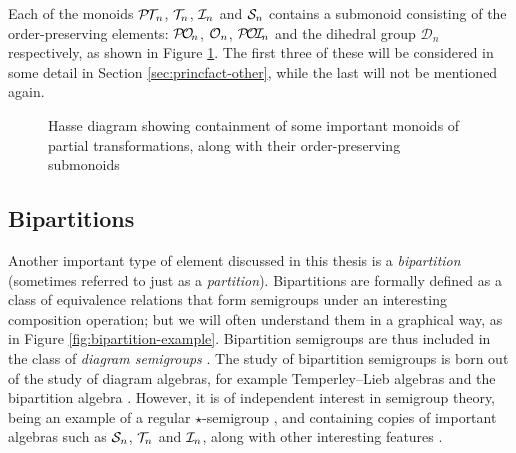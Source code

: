 Each of the monoids $\mathcal{P\!T\!}_n$, $\mathcal{T}_n$, $\mathcal{I}_n$ and $\mathcal{S}_n$ contains a submonoid
consisting of the order-preserving elements: $\mathcal{P\!O\!}_n$, $\mathcal{O}_n$, $\mathcal{P\!O\!I\!}_n$ and the
dihedral group $\mathcal{D}_n$ respectively, as shown in Figure
\ref{fig:ord-pres}.  The first three of these will be considered in some detail
in Section \ref{sec:princfact-other}, while the last will not be mentioned
again.

\begin{figure}[h]
  \centering
  \caption[Important monoids of partial transformations]{Hasse diagram showing
    containment of some important monoids of partial transformations, along with
    their order-preserving submonoids}
  \label{fig:ord-pres}
\end{figure}

\subsection{Bipartitions}
\label{sec:bipartitions}

Another important type of element discussed in this thesis is a
\textit{bipartition} (sometimes referred to just as a \textit{partition}).
Bipartitions are formally defined as a class of equivalence relations that form
semigroups under an interesting composition operation; but we will often
understand them in a graphical way, as in Figure \ref{fig:bipartition-example}.
Bipartition semigroups are thus included in the class of \textit{diagram
  semigroups} \cite{diagram_semigroups}.  The study of bipartition semigroups is
born out of the study of diagram algebras, for example Temperley--Lieb algebras
and the bipartition algebra \cite{partition_algebra}.  However, it is of
independent interest in semigroup theory, being an example of a regular
$\star$-semigroup \cite{reg_star_smgp}, and containing copies of important
algebras such as $\mathcal{S}_n$, $\mathcal{T}_n$ and $\mathcal{I}_n$, along with other interesting
features \cite[\S1]{deg_motzkin}.

